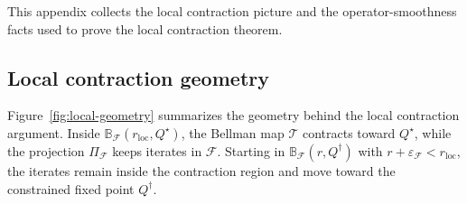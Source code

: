 \documentclass{article}
\theoremstyle{plain}
\theoremstyle{definition}
\theoremstyle{remark}
\begin{document}
This appendix collects the local contraction picture and the operator-smoothness facts used to prove the local contraction theorem.

\subsection{Local contraction geometry}
\label{app:local-geometry}

Figure~\ref{fig:local-geometry} summarizes the geometry behind the local
contraction argument. Inside \(\mathbb B_{\mathcal F}(r_{\mathrm{loc}},Q^\star)\), the Bellman map
\(\mathcal T\) contracts toward \(Q^\star\), while the projection
\(\Pi_{\mathcal F}\) keeps iterates in \(\mathcal F\). Starting in
\(\mathbb B_{\mathcal F}(r,Q^\dagger)\) with
\(r+\varepsilon_{\mathcal F}<r_{\mathrm{loc}}\), the iterates remain
inside the contraction region and move toward the constrained fixed point
\(Q^\dagger\).
\end{document}
